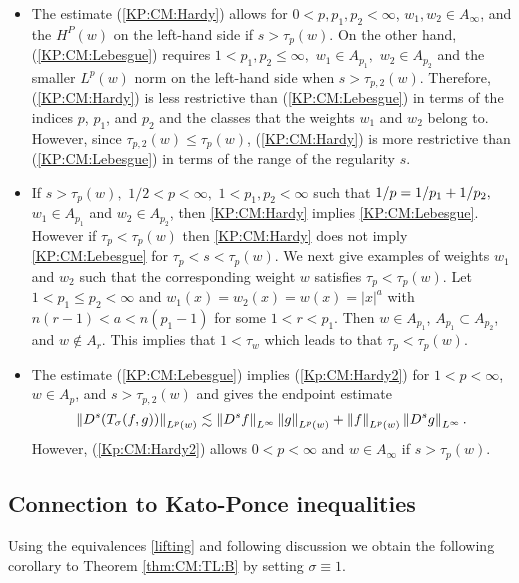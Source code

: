 \begin{itemize}
\item The estimate (\ref{KP:CM:Hardy}) allows for $0<p,p_1,p_2 < \infty$, $w_1,w_2 \in A_\infty$, and the $H^P(w)$ on the left-hand side if $s>\tau_p(w)$. On the other hand, (\ref{KP:CM:Lebesgue}) requires $1<p_1,p_2\le \infty,$ $w_1\in A_{p_1},$ $w_2\in A_{p_2}$ and the smaller $L^p(w)$ norm on the left-hand side when $s>\tau_{p,2}(w)$. Therefore, (\ref{KP:CM:Hardy}) is less restrictive than (\ref{KP:CM:Lebesgue}) in terms of the indices $p$, $p_1$, and $p_2$ and the classes that the weights $w_1$ and $w_2$ belong to. However, since $\tau_{p,2}(w) \leq \tau_p(w)$, (\ref{KP:CM:Hardy}) is more restrictive than (\ref{KP:CM:Lebesgue}) in terms of the range of the regularity $s$.
\item If $s>\tau_{p}(w),$   $1/2<p<\infty,$ $1<p_1,p_2<\infty$ such that $1/p=1/p_1+1/p_2,$  $w_1\in A_{p_1}$ and $w_2\in A_{p_2}$, then \eqref{KP:CM:Hardy} implies \eqref{KP:CM:Lebesgue}. However if $\tau_p < \tau_p(w)$ then \eqref{KP:CM:Hardy} does not imply \eqref{KP:CM:Lebesgue} for $\tau_p < s < \tau_p(w)$. We next give examples of weights $w_1$ and $w_2$ such that the corresponding weight $w$ satisfies $\tau_p < \tau_p(w)$.  Let $1<p_1\leq p_2 <\infty$ and $w_1(x) = w_2(x) = w(x) = |x|^a$ with $n(r-1)<a<n(p_1-1)$ for some $1<r<p_1$. Then $w \in A_{p_1}$, $A_{p_1} \subset A_{p_2}$, and $w \notin A_r$. This implies that $1<\tau_w$ which leads to that $\tau_p < \tau_p(w)$. 
\item  The estimate (\ref{KP:CM:Lebesgue}) implies (\ref{Kp:CM:Hardy2}) for $1<p<\infty$, $w\in A_p$, and $s>\tau_{p,2}(w)$ and gives the endpoint estimate 
$$ \left\|D^s(T_\sigma(f,g))\right\|_{L^p(w)} \lesssim \left\|D^s f\right\|_{L^{\infty}} \left\|g\right\|_{L^{p}(w)} +  \left\|f\right\|_{L^{p}(w)}\left\|D^s g\right\|_{L^\infty}. $$
However, (\ref{Kp:CM:Hardy2}) allows $0<p<\infty$ and $w\in A_\infty$ if $s>\tau_p (w)$.
\end{itemize}

\subsection{Connection to Kato-Ponce inequalities}
Using the equivalences \ref{lifting} and following discussion we obtain the following corollary to Theorem \ref{thm:CM:TL:B} by setting $\sigma \equiv 1$. 

